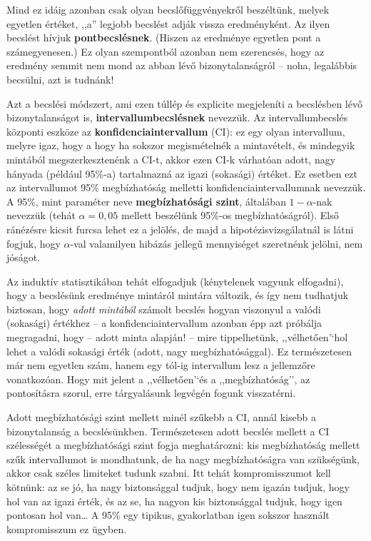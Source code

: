 \documentclass[]{book}
\begin{document}
Mind ez idáig azonban csak olyan becslőfüggvényekről beszéltünk, melyek
egyetlen értéket, ,,a'' legjobb becslést adják vissza eredményként. Az
ilyen becslést hívjuk \textbf{pontbecslésnek}. (Hiszen az eredménye
egyetlen pont a számegyenesen.) Ez olyan szempontból azonban nem
szerencsés, hogy az eredmény semmit nem mond az abban lévő
bizonytalanságról -- noha, legalábbis becsülni, azt is tudnánk!

Azt a becslési módszert, ami ezen túllép és explicite megjeleníti a
becslésben lévő bizonytalanságot is, \textbf{intervallumbecslésnek}
nevezzük. Az intervallumbecslés központi eszköze az
\textbf{konfidenciaintervallum} (CI): ez egy olyan intervallum, melyre
igaz, hogy a hogy ha sokszor megismételnék a mintavételt, és mindegyik
mintából megszerkesztenénk a CI-t, akkor ezen CI-k várhatóan adott, nagy
hányada (például 95\%-a) tartalmazná az igazi (sokasági) értéket. Ez
esetben ezt az intervallumot 95\% megbízhatóság melletti
konfidenciaintervallumnak nevezzük. A 95\%, mint paraméter neve
\textbf{megbízhatósági szint}, általában \(1-\alpha\)-nak nevezzük
(tehát \(\alpha=0,\!05\) mellett beszélünk 95\%-os megbízhatóságról).
Első ránézésre kicsit furcsa lehet ez a jelölés, de majd a
hipotézisvizsgálatnál is látni fogjuk, hogy \(\alpha\)-val valamilyen
hibázás jellegű mennyiséget szeretnénk jelölni, nem jóságot.

Az induktív statisztikában tehát elfogadjuk (kénytelenek vagyunk
elfogadni), hogy a becslésünk eredménye mintáról mintára változik, és
így nem tudhatjuk biztosan, hogy \emph{adott mintából} számolt becslés
hogyan viszonyul a valódi (sokasági) értékhez -- a
konfidenciaintervallum azonban épp azt próbálja megragadni, hogy --
adott minta alapján! -- mire tippelhetünk, ,,vélhetően'`hol lehet a
valódi sokasági érték (adott, nagy megbízhatósággal). Ez természetesen
már nem egyetlen szám, hanem egy tól-ig intervallum lesz a jellemzőre
vonatkozóan. Hogy mit jelent a ,,vélhetően'`és a ,,megbízhatóság'', az
pontosításra szorul, erre tárgyalásunk legvégén fogunk visszatérni.

Adott megbízhatósági szint mellett minél szűkebb a CI, annál kisebb a
bizonytalanság a becslésünkben. Természetesen adott becslés mellett a CI
szélességét a megbízhatósági szint fogja meghatározni: kis megbízhatóság
mellett szűk intervallumot is mondhatunk, de ha nagy megbízhatóságra van
szükségünk, akkor csak széles limiteket tudunk szabni. Itt tehát
kompromisszumot kell kötnünk: az se jó, ha nagy biztonsággal tudjuk,
hogy nem igazán tudjuk, hogy hol van az igazi érték, és az se, ha nagyon
kis biztonsággal tudjuk, hogy igen pontosan hol van\dots{} A 95\% egy
tipikus, gyakorlatban igen sokszor használt kompromisszum ez ügyben.
\end{document}
